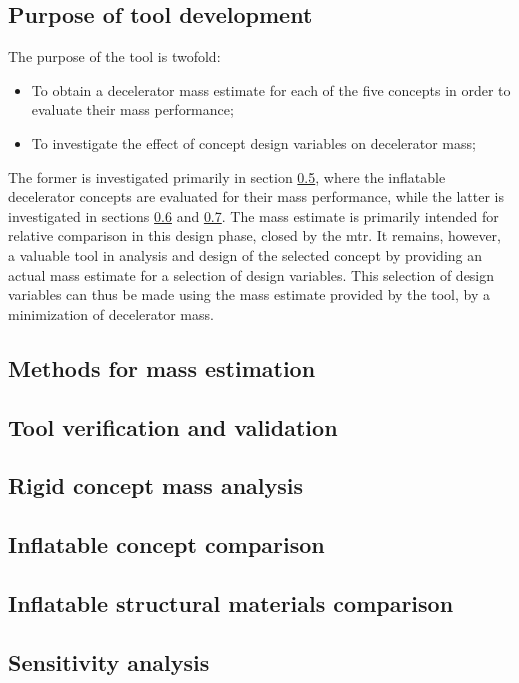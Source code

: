 \subsection{Purpose of tool development}\label{sec:strucpurp}
The purpose of the tool is twofold:
\begin{itemize}
\item To obtain a decelerator mass estimate for each of the five concepts in order to evaluate their mass performance;
\item To investigate the effect of concept design variables on decelerator mass;
\end{itemize}
The former is investigated primarily in section \ref{sec:struccc}, where the inflatable decelerator concepts are evaluated for their mass performance, while the latter is investigated in sections \ref{sec:strucmat} and \ref{sec:strucsens}. The mass estimate is primarily intended for relative comparison in this design phase, closed by the \acrfull{mtr}. It remains, however, a valuable tool in analysis and design of the selected concept by providing an actual mass estimate for a selection of design variables. This selection of design variables can thus be made using the mass estimate provided by the tool, by a minimization of decelerator mass.

\subsection{Methods for mass estimation}\label{sec:strucmeth}

\subsection{Tool verification and validation}\label{sec:strucvv}

\subsection{Rigid concept mass analysis}\label{sec:rigid}   %

\subsection{Inflatable concept comparison}\label{sec:struccc}

\subsection{Inflatable structural materials comparison}\label{sec:strucmat}

\subsection{Sensitivity analysis}\label{sec:strucsens}


